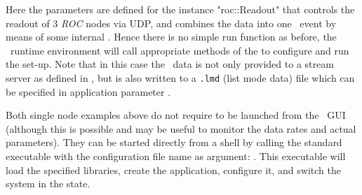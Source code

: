 Here the parameters are defined for the  instance
"roc::Readout" that controls  the readout of 3 {\em ROC} nodes via UDP, 
and combines the data into one \mbs\ event by means of some internal
. Hence there is no simple
run function as before, the \dabc\ runtime environment will call
appropriate methods of the  to configure and run
the set-up. Note that in this case the \mbs\ data is not only provided to a
stream server as defined in , but is also
written to a {\tt *.lmd} (list mode data) file which can be specified
in application parameter .

Both single node examples above do not require to be launched from the \dabc\ GUI (although this is possible and may be useful to monitor the data rates and actual parameters).
They can be started directly from a shell 
by calling the standard 
executable with the configuration file name as argument:
. 
This executable will load the specified libraries,
create the application, configure it, and switch the system in 
the  state.   

